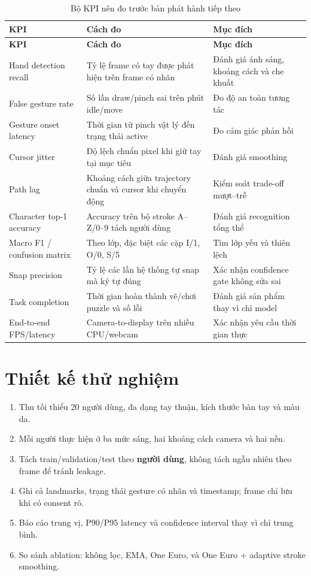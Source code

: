 \documentclass[12pt,a4paper,oneside]{report}
\begin{document}
\begin{longtable}{L{35mm}L{36mm}L{65mm}}
\caption{Bộ KPI nên đo trước bản phát hành tiếp theo}\\
\toprule
\textbf{KPI} & \textbf{Cách đo} & \textbf{Mục đích}\\
\midrule
\endfirsthead
\toprule
\textbf{KPI} & \textbf{Cách đo} & \textbf{Mục đích}\\
\midrule
\endhead
Hand detection recall & Tỷ lệ frame có tay được phát hiện trên frame có nhãn & Đánh giá ánh sáng, khoảng cách và che khuất\\
False gesture rate & Số lần draw/pinch sai trên phút idle/move & Đo độ an toàn tương tác\\
Gesture onset latency & Thời gian từ pinch vật lý đến trạng thái active & Đo cảm giác phản hồi\\
Cursor jitter & Độ lệch chuẩn pixel khi giữ tay tại mục tiêu & Đánh giá smoothing\\
Path lag & Khoảng cách giữa trajectory chuẩn và cursor khi chuyển động & Kiểm soát trade-off mượt--trễ\\
Character top-1 accuracy & Accuracy trên bộ stroke A--Z/0--9 tách người dùng & Đánh giá recognition tổng thể\\
Macro F1 / confusion matrix & Theo lớp, đặc biệt các cặp I/1, O/0, S/5 & Tìm lớp yếu và thiên lệch\\
Snap precision & Tỷ lệ các lần hệ thống tự snap mà ký tự đúng & Xác nhận confidence gate không sửa sai\\
Task completion & Thời gian hoàn thành vẽ/chơi puzzle và số lỗi & Đánh giá sản phẩm thay vì chỉ model\\
End-to-end FPS/latency & Camera-to-display trên nhiều CPU/webcam & Xác nhận yêu cầu thời gian thực\\
\bottomrule
\end{longtable}

\section{Thiết kế thử nghiệm}

\begin{enumerate}
  \item Thu tối thiểu 20 người dùng, đa dạng tay thuận, kích thước bàn tay và màu da.
  \item Mỗi người thực hiện ở ba mức sáng, hai khoảng cách camera và hai nền.
  \item Tách train/validation/test theo \textbf{người dùng}, không tách ngẫu nhiên theo frame để tránh leakage.
  \item Ghi cả landmarks, trạng thái gesture có nhãn và timestamp; frame chỉ lưu khi có consent rõ.
  \item Báo cáo trung vị, P90/P95 latency và confidence interval thay vì chỉ trung bình.
  \item So sánh ablation: không lọc, EMA, One Euro, và One Euro + adaptive stroke smoothing.
\end{enumerate}
\end{document}
